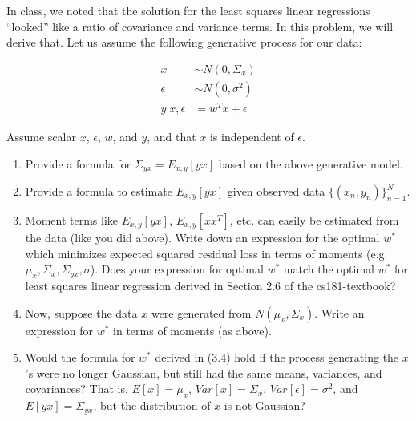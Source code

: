 \documentclass[submit]{harvardml}
\begin{document}
\newpage 


\begin{problem}

In class, we noted that the solution for the least squares linear regressions ``looked'' like a ratio of covariance and variance terms.  In this problem, we will derive that.  Let us assume the following generative process for our data:

\begin{eqnarray*}
  x &\sim N(0,\Sigma_x) \\
  \epsilon &\sim N(0,\sigma^2)\\
  y | x, \epsilon &= w^Tx + \epsilon 
  \end{eqnarray*}
  
Assume scalar $x$, $\epsilon$, $w$, and $y$, and that $x$ is independent of $\epsilon$.

\begin{enumerate}

\item Provide a formula for $\Sigma_{yx} = E_{x, y}[yx]$ based on the above generative model.

\item Provide a formula to estimate $E_{x, y}[yx]$ given observed data $\{(x_n,y_n)\}_{n=1}^N$.

\item Moment terms like $E_{x, y}[yx]$, $E_{x, y}[xx^T]$, etc. can easily be
  estimated from the data (like you did above).  Write down an
  expression for the optimal $w^*$ which minimizes expected squared residual loss 
  in terms of moments
  (e.g. $\mu_x,\Sigma_x,\Sigma_{yx},\sigma$). Does your expression for optimal $w^*$ match the optimal $w^*$ for least squares linear regression derived in Section 2.6 of the cs181-textbook?

\item Now, suppose the data $x$ were generated from
  $N(\mu_x,\Sigma_x)$.  Write an expression for $w^*$ in terms of
  moments (as above).  
  
\item Would the formula for $w^*$ derived in (3.4) hold if the process generating the $x$'s
  were no longer Gaussian, but still had the same means, variances, and covariances?
  That is, $E[x]=\mu_x$, $Var[x]=\Sigma_x$, $Var[\epsilon] = \sigma^2$, and $E[yx] = \Sigma_{y x}$, but the distribution of $x$
  is not Gaussian?  
  
\end{enumerate}

\end{problem}
\end{document}
